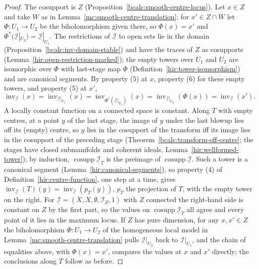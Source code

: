 \begin{proof}
\leanok
The cosupport is \(Z\) (Proposition~\ref{bcalc:smooth-centre-locus}). Let \(x\in Z\) and take \(W\) as in Lemma~\ref{mc:smooth-centre-translation}; for \(x'\in Z\cap W\) let
\(\Phi\colon U_1\to U_2\) be the biholomorphism given there, so \(\Phi(x)=x'\) and \(\Phi^*(\underline{\mathcal I}|_{U_2})=\underline{\mathcal I}|_{U_1}\). The restrictions of
\(\underline{\mathcal I}\) to open sets lie in the domain (Proposition~\ref{bcalc:inv-domain-stable}) and have the traces of \(Z\) as cosupports
(Lemma~\ref{hir:open-restriction-marked}); the empty towers over \(U_1\) and \(U_2\) are isomorphic over \(\Phi\) with last-stage map \(\Phi\)
(Definition~\ref{hir:tower-isomorphism}) and are canonical segments. By property (5) at \(x\), property (6) for these empty towers, and property (5) at \(x'\),
\[\operatorname{inv}_{\underline{\mathcal I}}(x)=\operatorname{inv}_{\underline{\mathcal I}|_{U_1}}(x)=\operatorname{inv}_{\Phi^*(\underline{\mathcal I}|_{U_2})}(x)
=\operatorname{inv}_{\underline{\mathcal I}|_{U_2}}(\Phi(x))=\operatorname{inv}_{\underline{\mathcal I}}(x').\]
A locally constant function on a connected space is constant.
Along \(T\) with empty centres, at a point \(y\) of the last stage, the image of \(y\) under the last blowup lies off its (empty) centre, so \(y\) lies in the
cosupport of the transform iff its image lies in the cosupport of the preceding stage (Theorem~\ref{bcalc:transform-off-centre}; the stages have closed
submanifolds and coherent ideals, Lemma~\ref{hir:wellformed-tower}); by induction, \(\operatorname{cosupp}\underline{\mathcal I}_T\) is the preimage of
\(\operatorname{cosupp}\underline{\mathcal I}\). Such a tower is a canonical segment (Lemma~\ref{hir:canonical-segments}), so property (4) of
Definition~\ref{hir:centre-function}, one step at a time, gives \(\operatorname{inv}_{\underline{\mathcal I}}(T)(y)=\operatorname{inv}_{\underline{\mathcal I}}(p_T(y))\),
\(p_T\) the projection of \(T\), with the empty tower on the right. For \(\underline{\mathcal I}=(X,X,\emptyset,\mathcal I_Z,1)\) with \(Z\) connected the right-hand side is constant on \(Z\) by the
first part, so the values on \(\operatorname{cosupp}\underline{\mathcal I}_T\) all agree and every point of it lies in the maximum locus.
If \(Z\) has pure dimension, for any \(x,x'\in Z\) the biholomorphism \(\Phi\colon U_1\to U_2\) of the homogeneous local model in
Lemma~\ref{mc:smooth-centre-translation} pulls \(\underline{\mathcal I}|_{U_2}\) back to \(\underline{\mathcal I}|_{U_1}\), and the chain of equalities above, with
\(\Phi(x)=x'\), compares the values at \(x\) and \(x'\) directly; the conclusions along \(T\) follow as before.
\end{proof}

